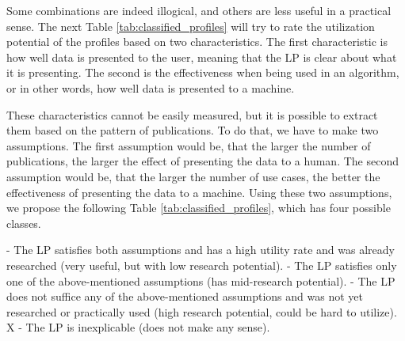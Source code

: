 Some combinations are indeed illogical, and others are less useful in a practical sense.
The next Table \ref{tab:classified_profiles} will try to rate the utilization potential of the profiles based on two characteristics. 
The first characteristic is how well data is presented to the user,
meaning that the LP is clear about what it is presenting.
The second is the effectiveness when being used in an algorithm, or in other words, how well data is presented to a machine. 

These characteristics cannot be easily measured,
but it is possible to extract them based on the pattern of publications.
To do that, we have to make two assumptions.
The first assumption would be, that the larger the number of publications, the larger the effect of presenting the data to a human.
The second assumption would be, that the larger the number of use cases, the better the effectiveness of presenting the data to a machine.
Using these two assumptions, we propose the following Table \ref{tab:classified_profiles}, which has four possible classes. 

\begin{outline} 
 - The LP satisfies both assumptions and has a high utility rate and was already researched (very useful, but with low research potential). 
 - The LP satisfies only one of the above-mentioned assumptions (has mid-research potential).
 - The LP does not suffice any of the above-mentioned assumptions and was not yet researched or practically used (high research potential, could be hard to utilize).
\1 X - The LP is inexplicable (does not make any sense).
\end{outline}

